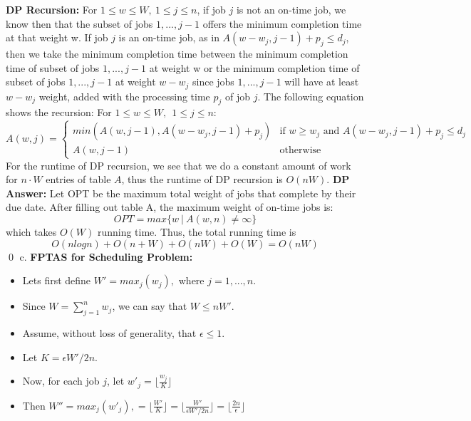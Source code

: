\documentclass[oneside]{homework} %
\begin{document}
\newline
\newline
\textbf{DP Recursion:} 
\newline
For $1 \leq w \leq W, \ 1 \leq j \leq n$, if job $j$ is not an on-time job, we know then that the subset of jobs $1,...,j-1$ offers the minimum completion time at that weight w. If job $j$ is an on-time job, as in $A(w-w_j, j-1) + p_j \leq d_j$, then we take the minimum completion time between the minimum completion time of subset of jobs $1,...,j-1$ at weight w or the minimum completion time of subset of jobs $1,...,j-1$ at weight $w-w_j$ since jobs $1,...,j-1$ will have at least $w-w_j$ weight, added with the processing time $p_j$ of job $j$. The following equation shows the recursion:
\newline
\newline
For $1 \leq w \leq W, \ \ 1 \leq j \leq n$:
\begin{equation*}
  A(w,j) =
  \begin{cases}
    min(A(w, j-1), A(w-w_j, j-1) + p_j) & \text{if $w \geq w_j$ and $A(w-w_j, j-1) + p_j \leq d_j$} \\
    A(w, j-1) & \text{otherwise}
  \end{cases}
\end{equation*}
For the runtime of DP recursion, we see that we do a constant amount of work for $n\cdot W$ entries of table $A$, thus the runtime of DP recursion is $O(nW)$.
\newline
\newline
\textbf{DP Answer:}
\newline
Let OPT be the maximum total weight of jobs that complete by their due date. After filling out table A, the maximum weight of on-time jobs is: $$OPT = max\{ w \ | \ A(w,n) \neq \infty \}$$ which takes $O(W)$ running time. Thus, the total running time is $$O(nlogn) + O(n + W) + O(nW) + O(W) = O(nW)$$ \hfill\qed
\newline
\newline
{\large c.} \textbf{FPTAS for Scheduling Problem:}
\begin{itemize}
  \item Lets first define $W' = max_j (w_j),$ where $j = 1,...,n$.
  \item Since $W = \sum\limits_{j=1}^{n}w_j$, we can say that $W \leq nW'$.
  \item Assume, without loss of generality, that $\epsilon \leq 1$.
  \item Let $K = \epsilon W' / 2n$.
  \item Now, for each job $j$, let $w'_j = \lfloor\frac{w_j}{K}\rfloor$
  \item Then $W'' = max_j(w'_j) ,= \lfloor\frac{W'}{K}\rfloor = \lfloor\frac{W'}{\epsilon W'/2n}\rfloor = \lfloor\frac{2n}{\epsilon}\rfloor$
\end{itemize}
\end{document}
